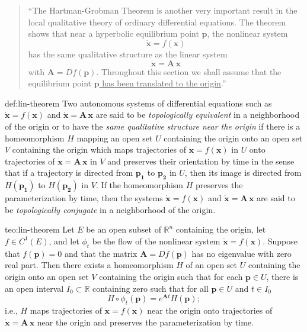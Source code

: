 \begin{quote}
    ``The Hartman-Grobman Theorem is another very important result in the local qualitative theory of ordinary differential equations. The theorem shows that near a hyperbolic equilibrium point $\pmb{p}$, the nonlinear system
    $$
        \pmb{\dot{x}} = f(\pmb{x})
    $$
    has the same qualitative structure as the linear system
    $$
        \pmb{\dot{x}} = \pmb{A}\,\pmb{x}
    $$    
    with $\pmb{A} = Df(\pmb{p})$. Throughout this section we shall assume that the equilibrium point \underline{$\pmb{p}$ has been translated to the origin}.''\cite{Perko2013}
\end{quote}

\begin{theo}{def:lin-theorem}\label{def:lin-theorem}
    Two autonomous systems of differential equations such as $\pmb{\dot{x}} = f(\pmb{x})$ and $\pmb{\dot{x}} = \pmb{A}\,\pmb{x}$ are said to be \textit{topologically equivalent} in a neighborhood of the origin or to have the \textit{same qualitative structure near the origin} if there is a homeomorphism $H$ mapping an open set $U$ containing the origin onto an open set $V$ containing the origin which maps trajectories of $\pmb{\dot{x}} = f(\pmb{x})$ in $U$ onto trajectories of $\pmb{\dot{x}} = \pmb{A}\,\pmb{x}$ in $V$ and preserves their orientation by time in the sense that if a trajectory is directed from $\pmb{p_1}$ to $\pmb{p_2}$ in $U$, then its image is directed from $H(\pmb{p_1})$ to $H(\pmb{p_2})$ in $V$. If the homeomorphism $H$ preserves the parameterization by time, then the systems $\pmb{\dot{x}} = f(\pmb{x})$ and $\pmb{\dot{x}} = \pmb{A}\,\pmb{x}$ are said to be \textit{topologically conjugate} in a neighborhood of the origin.
\end{theo}

\begin{theo}{teo:lin-theorem}\label{teo:lin-theorem}
     Let $E$ be an open subset of $\mathbb{R}^n$ containing the origin, let $f \in C^1(E)$, and let $\phi_t$ be the flow of the nonlinear system $\pmb{\dot{x}} = f(\pmb{x})$. Suppose that $f(\pmb{p}) = 0$ and that the matrix $\pmb{A} = Df(\pmb{p})$ has no eigenvalue with zero real part. Then there exists a homeomorphism $H$ of an open set $U$ containing the origin onto an open set $V$ containing the origin such that for each $\pmb{p}\in U$, there is an open interval $I_0 \subset \mathbb{R}$ containing zero such that for all $\pmb{p} \in U$ and $t \in I_0$ 
     $$
        H \circ \phi_t(\pmb{p}) = e^{\pmb{A}t} H(\pmb{p}); 
     $$
     i.e., $H$ maps trajectories of $\pmb{\dot{x}} = f(\pmb{x})$ near the origin onto trajectories of $\pmb{\dot{x}} = \pmb{A}\,\pmb{x}$ near the origin and preserves the parameterization by time.
\end{theo}

